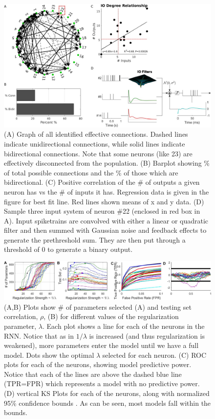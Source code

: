 \documentclass[11pt,a4paper,final]{article}
\begin{document}
\begin{figure}[!ht]
	\centering
	\includegraphics[width=160mm]{graph}
	\caption[Graph \& Example System]{
		(A) Graph of all identified effective connections. Dashed lines indicate unidirectional connections, while solid lines indicate bidirectional connections. Note that some neurons (like 23) are effectively disconnected from the population.
		(B) Barplot showing \% of total possible connections and the \% of those which are bidirectional.
		(C) Positive correlation of the \# of outputs a given neuron has vs the \# of inputs it has. Regression data is given in the figure for best fit line. Red lines shown means of x and y data.
		(D) Sample three input system of neuron \#22 (enclosed in red box in A). Input spiketrains are convolved with either a linear or quadratic filter and then summed with Gaussian noise and feedback effects to generate the prethreshold sum. They are then put through a threshold of 0 to generate a binary output.}
	\label{graph}
\end{figure}

\begin{figure}[!ht]
	\centering
	\includegraphics[width=170mm]{regpath}
	\caption[Regularization Path]{
		(A,B) Plots show \# of parameters selected (A) and testing set correlation, $\rho$, (B) for different values of the regularization parameter, $\lambda$. Each plot shows a line for each of the \nn{} neurons in the RNN. Notice that as in $1/\lambda$ is increased (and thus regularization is weakened), more parameters enter the model until we have a full model. Dots show the optimal $\lambda$ selected for each neuron.
		(C) ROC plots for each of the \nn{} neurons, showing model predictive power. Notice that each of the lines are above the dashed blue line (TPR=FPR) which represents a model with no predictive power.
		(D) vertical KS Plots for each of the \nn{} neurons, along with normalized 95\% confidence bounds \citep{song13sparse}. As can be seen, most models fall within the bounds.}
	\label{regpath}
\end{figure}
\end{document}
